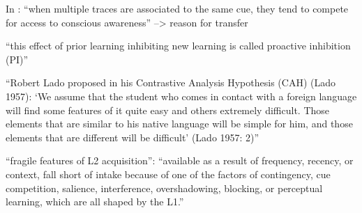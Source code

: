 In \cite{Ellis06}: ``when multiple
traces are associated to the same cue, they tend to compete for access to
conscious awareness'' --> reason for transfer

``this effect of prior learning inhibiting
new learning is called proactive inhibition (PI)''

``Robert Lado proposed in his
Contrastive Analysis Hypothesis (CAH) (Lado 1957): ‘We assume that the
student who comes in contact with a foreign language will find some features
of it quite easy and others extremely difficult. Those elements that are similar
to his native language will be simple for him, and those elements that
are different will be difficult’ (Lado 1957: 2)''


        ``fragile features of L2 acquisition'': ``available as a
        result of frequency, recency, or context, fall short of intake because of one of the
        factors of contingency, cue competition, salience, interference, overshadowing,
        blocking, or perceptual learning, which are all shaped by the L1.''




